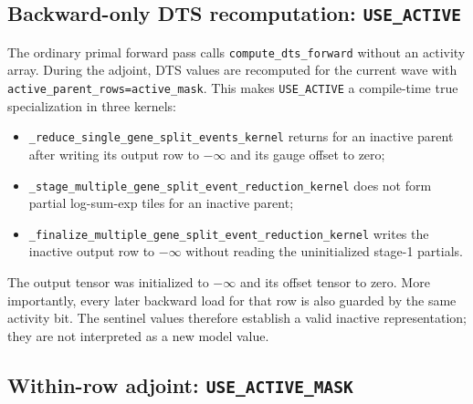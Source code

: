 \documentclass[11pt]{article}
\newcommand{\kernel}[1]{\nolinkurl{#1}}
\newcommand{\code}[1]{\nolinkurl{#1}}
\begin{document}
\subsection{Backward-only DTS recomputation: \texttt{USE\_ACTIVE}}

The ordinary primal forward pass calls \code{compute\_dts\_forward} without an
activity array.  During the adjoint, DTS values are recomputed for the current
wave with \code{active\_parent\_rows=active\_mask}.  This makes
\code{USE\_ACTIVE} a compile-time true specialization in three kernels:
\begin{itemize}
  \item \kernel{_reduce_single_gene_split_events_kernel} returns for an inactive parent after writing
        its output row to $-\infty$ and its gauge offset to zero;
  \item \kernel{_stage_multiple_gene_split_event_reduction_kernel} does not form partial log-sum-exp
        tiles for an inactive parent;
  \item \kernel{_finalize_multiple_gene_split_event_reduction_kernel} writes the inactive output row to
        $-\infty$ without reading the uninitialized stage-1 partials.
\end{itemize}
The output tensor was initialized to $-\infty$ and its offset tensor to zero.
More importantly, every later backward load for that row is also guarded by
the same activity bit.  The sentinel values therefore establish a valid
inactive representation; they are not interpreted as a new model value.

\subsection{Within-row adjoint: \texttt{USE\_ACTIVE\_MASK}}
\end{document}
